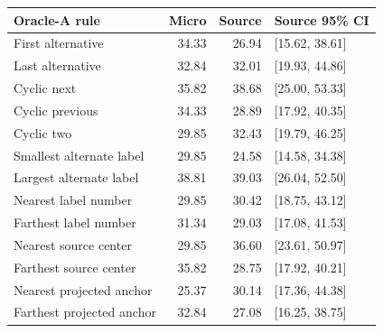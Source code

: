 \begin{tabular}{@{}lrrl@{}}
\toprule
Oracle-A rule & Micro & Source & Source 95\% CI\\
\midrule
First alternative & 34.33 & 26.94 & [15.62, 38.61]\\
Last alternative & 32.84 & 32.01 & [19.93, 44.86]\\
Cyclic next & 35.82 & 38.68 & [25.00, 53.33]\\
Cyclic previous & 34.33 & 28.89 & [17.92, 40.35]\\
Cyclic two & 29.85 & 32.43 & [19.79, 46.25]\\
Smallest alternate label & 29.85 & 24.58 & [14.58, 34.38]\\
Largest alternate label & 38.81 & 39.03 & [26.04, 52.50]\\
Nearest label number & 29.85 & 30.42 & [18.75, 43.12]\\
Farthest label number & 31.34 & 29.03 & [17.08, 41.53]\\
Nearest source center & 29.85 & 36.60 & [23.61, 50.97]\\
Farthest source center & 35.82 & 28.75 & [17.92, 40.21]\\
Nearest projected anchor & 25.37 & 30.14 & [17.36, 44.38]\\
Farthest projected anchor & 32.84 & 27.08 & [16.25, 38.75]\\
\bottomrule
\end{tabular}
